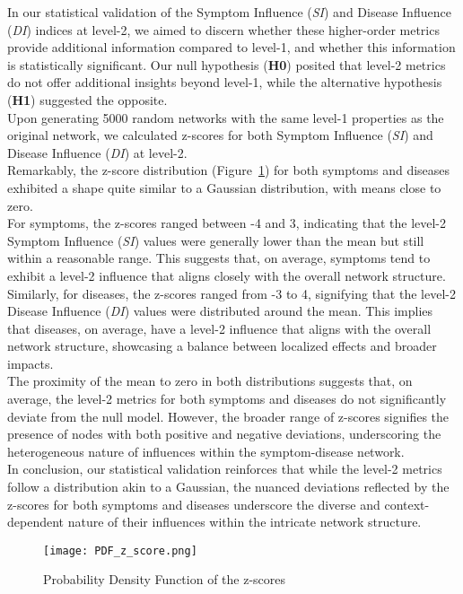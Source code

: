 In our statistical validation of the Symptom Influence (\textit{SI}) and Disease Influence (\textit{DI}) indices at level-2,
we aimed to discern whether these higher-order metrics provide additional information compared to level-1,
and whether this information is statistically significant.
Our null hypothesis (\textbf{H0}) posited that level-2 metrics do not offer additional insights beyond level-1,
while the alternative hypothesis (\textbf{H1}) suggested the opposite.\\
Upon generating 5000 random networks with the same level-1 properties as the original network,
we calculated z-scores for both Symptom Influence (\textit{SI}) and Disease Influence (\textit{DI}) at level-2.\\
Remarkably, the z-score distribution (Figure~\ref{fig:pdf_z_score}) for both symptoms and diseases exhibited a shape quite similar to a Gaussian distribution,
with means close to zero.\\
For symptoms, the z-scores ranged between -4 and 3, indicating that the level-2 Symptom Influence (\textit{SI})
values were generally lower than the mean but still within a reasonable range. This suggests that, on average,
symptoms tend to exhibit a level-2 influence that aligns closely with the overall network structure.\\
Similarly, for diseases, the z-scores ranged from -3 to 4, signifying that the level-2 Disease Influence
(\textit{DI}) values were distributed around the mean.
This implies that diseases, on average, have a level-2 influence that aligns with the overall network structure,
showcasing a balance between localized effects and broader impacts.\\
The proximity of the mean to zero in both distributions suggests that, on average,
the level-2 metrics for both symptoms and diseases do not significantly deviate from the null model.
However, the broader range of z-scores signifies the presence of nodes with both positive and negative deviations,
underscoring the heterogeneous nature of influences within the symptom-disease network.\\
In conclusion, our statistical validation reinforces that while the level-2 metrics follow a distribution akin to a Gaussian,
the nuanced deviations reflected by the z-scores
for both symptoms and diseases underscore the diverse and context-dependent nature of their influences within the intricate network structure.

\begin{figure}[H]
    \centering
    \texttt{[image: PDF\_z\_score.png]}
    \caption{Probability Density Function of the z-scores}\label{fig:pdf_z_score}
\end{figure}

